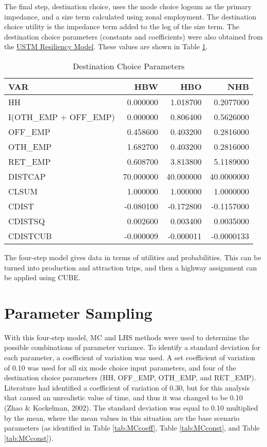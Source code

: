 \documentclass[fancy, masters,twoside]{byuthesis}
\begin{document}
The final step, destination choice, uses the mode choice logsum as the primary impedance, and a size term calculated using zonal employment. The destination choice utility is the impedance term added to the log of the size term. The destination choice parameters (constants and coefficients) were also obtained from the \href{https://github.com/byu-transpolab/ustm_resiliency}{USTM Resiliency Model}. These values are shown in Table \ref{tab:DCcoeff}.

\begin{table}

\caption{\label{tab:DCcoeff}Destination Choice Parameters}
\centering
\begin{tabular}[t]{lrrr}
\toprule
VAR & HBW & HBO & NHB\\
\midrule
HH & 0.000000 & 1.018700 & 0.2077000\\
I(OTH\_EMP + OFF\_EMP) & 0.000000 & 0.806400 & 0.5626000\\
OFF\_EMP & 0.458600 & 0.403200 & 0.2816000\\
OTH\_EMP & 1.682700 & 0.403200 & 0.2816000\\
RET\_EMP & 0.608700 & 3.813800 & 5.1189000\\
\addlinespace
DISTCAP & 70.000000 & 40.000000 & 40.0000000\\
CLSUM & 1.000000 & 1.000000 & 1.0000000\\
CDIST & -0.080100 & -0.172800 & -0.1157000\\
CDISTSQ & 0.002600 & 0.003400 & 0.0035000\\
CDISTCUB & -0.000009 & -0.000011 & -0.0000133\\
\bottomrule
\end{tabular}
\end{table}

The four-step model gives data in terms of utilities and probabilities. This can be turned into production and attraction trips, and then a highway assignment can be applied using CUBE.

\hypertarget{parameter-sampling}{%
\section{Parameter Sampling}\label{parameter-sampling}}

With this four-step model, MC and LHS methods were used to determine the possible combinations of parameter variance. To identify a standard deviation for each parameter, a coefficient of variation was used. A set coefficient of variation of 0.10 was used for all six mode choice input parameters, and four of the destination choice parameters (HH, OFF\_EMP, OTH\_EMP, and RET\_EMP). Literature had identified a coefficient of variation of 0.30, but for this analysis that caused an unrealistic value of time, and thus it was changed to be 0.10 (Zhao \& Kockelman, 2002). The standard deviation was equal to 0.10 multiplied by the mean, where the mean values in this situation are the base scenario parameters (as identified in Table \ref{tab:MCcoeff}, Table \ref{tab:MCconst}, and Table \ref{tab:MCconst}).
\end{document}
